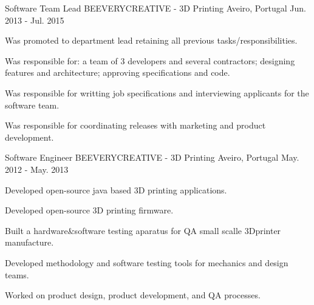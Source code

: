 \begin{cventries}

  \cventry
    {Software Team Lead} %
    {BEEVERYCREATIVE - 3D Printing} %
    {Aveiro, Portugal} %
    {Jun. 2013 - Jul. 2015} %
    {
      \begin{cvitems} %
      \item {Was promoted to department lead retaining all previous tasks/responsibilities.}
        \item {Was responsible for: a team of 3 developers and several contractors; designing features and architecture; approving specifications and code.}
        \item {Was responsible for writting job specifications and interviewing applicants for the software team.}
	\item {Was responsible for coordinating releases with marketing and product development.} 
      \end{cvitems}
    }


  \cventry
    {Software Engineer} %
    {BEEVERYCREATIVE - 3D Printing} %
    {Aveiro, Portugal} %
    {May. 2012 - May. 2013} %
    {
      \begin{cvitems} %
        \item {Developed open-source java based 3D printing applications.}
        \item {Developed open-source 3D printing firmware.}
	\item {Built a hardware\&software testing aparatus for QA small scalle 3Dprinter manufacture.}
        \item {Developed methodology and software testing tools for mechanics and design teams.}
        \item {Worked on product design, product development, and QA processes.}
      \end{cvitems}
    }



\end{cventries}
